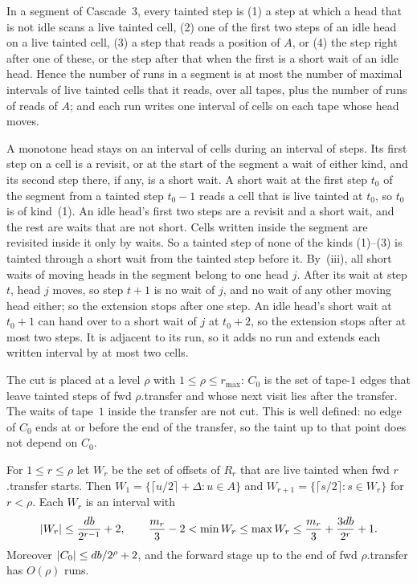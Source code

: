 \begin{lemma}[Segments]\label{lem:c3-segments}
\notformalized
In a segment of Cascade~3, every tainted step is (1) a step at which a head that is not idle scans a live tainted cell, (2) one of the
first two steps of an idle head on a live tainted cell, (3) a step that reads a position of $A$, or (4) the step right after one of
these, or the step after that when the first is a short wait of an idle head. Hence the number of runs in a segment is at most the
number of maximal intervals of live tainted cells that it reads, over all tapes, plus the number of runs of reads of $A$; and each run
writes one interval of cells on each tape whose head moves.
\end{lemma}

\begin{informalproof}
A monotone head stays on an interval of cells during an interval of steps. Its first step on a cell is a revisit, or at the start of
the segment a wait of either kind, and its second step there, if any, is a short wait. A short wait at the first step $t_0$ of the
segment from a tainted step $t_0-1$ reads a cell that is live tainted at $t_0$, so $t_0$ is of kind~(1). An idle head's first two steps
are a revisit and a short wait, and the rest are waits that are not short. Cells written inside the segment are revisited inside it only
by waits. So a tainted step of none of the kinds (1)--(3) is tainted through a short wait from the tainted step before it. By~(iii), all
short waits of moving heads in the segment belong to one head $j$. After its wait at step $t$, head $j$ moves, so step $t+1$ is no wait
of $j$, and no wait of any other moving head either; so the extension stops after one step. An idle head's short wait at $t_0+1$ can hand
over to a short wait of $j$ at $t_0+2$, so the extension stops after at most two steps. It is adjacent to its run, so it adds no run and
extends each written interval by at most two cells.
\end{informalproof}

The cut is placed at a level $\rho$ with $1\le\rho\le r_{\max}$: $C_0$ is the set of tape-$1$ edges that leave tainted steps of
fwd $\rho$.transfer and whose next visit lies after the transfer. The waits of tape~$1$ inside the transfer are not cut. This is well
defined: no edge of $C_0$ ends at or before the end of the transfer, so the taint up to that point does not depend on $C_0$.

\begin{lemma}\label{lem:c3-forward}
\notformalized
For $1\le r\le\rho$ let $W_r$ be the set of offsets of $R_r$ that are live tainted when fwd $r$.transfer starts. Then
$W_1=\{\lceil u/2\rceil+\Delta:u\in A\}$ and $W_{r+1}=\{\lceil s/2\rceil:s\in W_r\}$ for $r<\rho$. Each $W_r$ is an interval with
\[
  \lvert W_r \rvert\le\frac{db}{2^{r-1}}+2,\qquad \frac{m_r}3-2<\min W_r\le\max W_r\le\frac{m_r}3+\frac{3db}{2^r}+1 .
\]
Moreover $\lvert C_0 \rvert\le db/2^\rho+2$, and the forward stage up to the end of fwd $\rho$.transfer has $O(\rho)$ runs.
\end{lemma}

